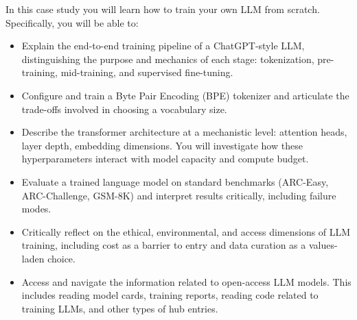 \begin{learningbox}
In this case study you will learn how to train your own LLM from scratch. 
Specifically, you will be able to:
\begin{itemize}[leftmargin=*, nosep]
    \item Explain the end-to-end training pipeline of a ChatGPT-style LLM, distinguishing the purpose and mechanics of each stage: tokenization, pre-training, mid-training, and supervised fine-tuning.
    \item Configure and train a Byte Pair Encoding (BPE) tokenizer and articulate the trade-offs involved in choosing a vocabulary size.
    \item Describe the transformer architecture at a mechanistic level: attention heads, layer depth, embedding dimensions. You will investigate how these hyperparameters interact with model capacity and compute budget.
    \item Evaluate a trained language model on standard benchmarks (ARC-Easy, ARC-Challenge, GSM-8K) and interpret results critically, including failure modes.
    \item Critically reflect on the ethical, environmental, and access dimensions of LLM training, including cost as a barrier to entry and data curation as a values-laden choice.
    \item Access and navigate the information related to open-access LLM models. This includes reading model cards, training reports, reading code related to training LLMs, and other types of hub entries.
\end{itemize}
\end{learningbox}


